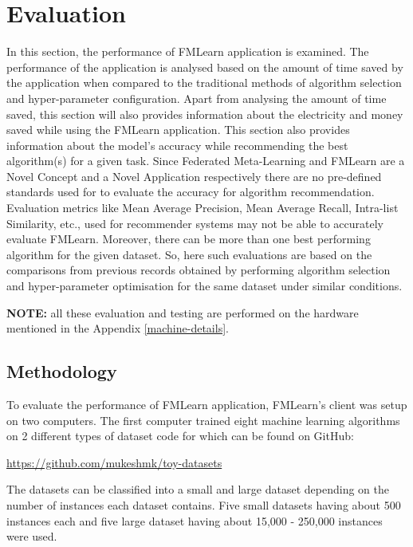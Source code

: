 \chapter{Evaluation}

In this section, the performance of FMLearn application is examined. The performance of the application is analysed based on the amount of time saved by the application when compared to the traditional methods of algorithm selection and hyper-parameter configuration. Apart from analysing the amount of time saved, this section will also provides information about the electricity and money saved while using the FMLearn application. This section also provides information about the model's accuracy while recommending the best algorithm(s) for a given task. Since Federated Meta-Learning and FMLearn are a Novel Concept and a Novel Application respectively there are no pre-defined standards used for to evaluate the accuracy for algorithm recommendation. Evaluation metrics like Mean Average Precision, Mean Average Recall, Intra-list Similarity, etc., used for recommender systems may not be able to accurately evaluate FMLearn. Moreover, there can be more than one best performing algorithm for the given dataset. So, here such evaluations are based on the comparisons from previous records obtained by performing algorithm selection and hyper-parameter optimisation for the same dataset under similar conditions.

\textbf{NOTE:} all these evaluation and testing are performed on the hardware mentioned in the Appendix \ref{machine-details}.

\section{Methodology}

To evaluate the performance of FMLearn application, FMLearn's client was setup on two computers. The first computer trained eight machine learning algorithms on 2 different types of dataset code for which can be found on GitHub:
\begin{center}
    \href{https://github.com/mukeshmk/toy-datasets}{https://github.com/mukeshmk/toy-datasets}
\end{center}

The datasets can be classified into a small and large dataset depending on the number of instances each dataset contains. Five small datasets having about 500 instances each and five large dataset having about 15,000 - 250,000 instances were used.

